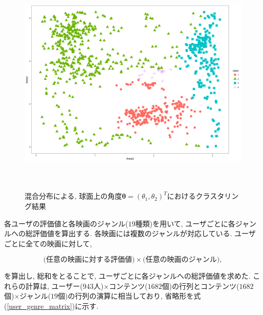 \documentclass[a4j,12pt]{jarticle}
\begin{document}
\newpage %
\begin{figure}[tbp]
\begin{center}
\includegraphics[clip,height= 110mm]{data/cluster_4.png}
\end{center}
\caption{混合分布による, 球面上の角度$\bm \theta = (\theta_1, \theta_2)^T$におけるクラスタリング結果}
\label{clusterplot2d}
\end{figure}

\newpage
\clearpage
各ユーザの評価値と各映画のジャンル($19$種類)を用いて, ユーザごとに各ジャンルへの総評価値を算出する. 各映画には複数のジャンルが対応している. ユーザごとに全ての映画に対して, 

\begin{equation*}
\mbox{(任意の映画に対する評価値)} \times \mbox{(任意の映画のジャンル)},
\end{equation*}

\noindent
を算出し, 総和をとることで, ユーザごとに各ジャンルへの総評価値を求めた. これらの計算は, ユーザー($943$人)$\times$コンテンツ($1682$個)の行列とコンテンツ($1682$個)$\times$ジャンル($19$個)の行列の演算に相当しており, 省略形を式(\ref{user_genre_matrix})に示す. 
\end{document}
